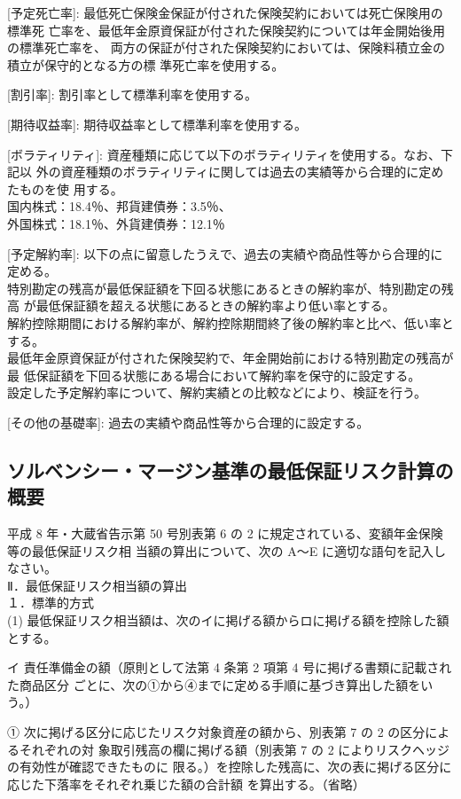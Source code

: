 \documentclass[report,gutter=10mm,fore-edge=10mm,uplatex,dvipdfmx]{jlreq}
\begin{document}
{[予定死亡率]: 最低死亡保険金保証が付された保険契約においては死亡保険用の標準死
亡率を、最低年金原資保証が付された保険契約については年金開始後用の標準死亡率を、
両方の保証が付された保険契約においては、保険料積立金の積立が保守的となる方の標
準死亡率を使用する。

[割引率]: 割引率として標準利率を使用する。

[期待収益率]: 期待収益率として標準利率を使用する。

[ボラティリティ]: 資産種類に応じて以下のボラティリティを使用する。なお、下記以
外の資産種類のボラティリティに関しては過去の実績等から合理的に定めたものを使
用する。\\
国内株式：18.4％、邦貨建債券：3.5％、\\
外国株式：18.1％、外貨建債券：12.1％

[予定解約率]: 以下の点に留意したうえで、過去の実績や商品性等から合理的に定める。\\
特別勘定の残高が最低保証額を下回る状態にあるときの解約率が、特別勘定の残高
が最低保証額を超える状態にあるときの解約率より低い率とする。\\
解約控除期間における解約率が、解約控除期間終了後の解約率と比べ、低い率とする。\\
最低年金原資保証が付された保険契約で、年金開始前における特別勘定の残高が最
低保証額を下回る状態にある場合において解約率を保守的に設定する。\\
設定した予定解約率について、解約実績との比較などにより、検証を行う。

[その他の基礎率]: 過去の実績や商品性等から合理的に設定する。

\subsection{ソルベンシー・マージン基準の最低保証リスク計算の概要}
平成 8 年・大蔵省告示第 50 号別表第 6 の 2 に規定されている、変額年金保険等の最低保証リスク相
当額の算出について、次の A～E に適切な語句を記入しなさい。\\
Ⅱ．最低保証リスク相当額の算出\\
１．標準的方式\\
(1) 最低保証リスク相当額は、次のイに掲げる額からロに掲げる額を控除した額とする。

イ  責任準備金の額（原則として法第 4 条第 2 項第 4 号に掲げる書類に記載された商品区分
ごとに、次の①から④までに定める手順に基づき算出した額をいう。）

① 次に掲げる区分に応じたリスク対象資産の額から、別表第 7 の 2 の区分によるそれぞれの対
象取引残高の欄に掲げる額（別表第 7 の 2 によりリスクヘッジの有効性が確認できたものに
限る。）を控除した残高に、次の表に掲げる区分に応じた下落率をそれぞれ乗じた額の合計額
を算出する。（省略）

}
\end{document}
